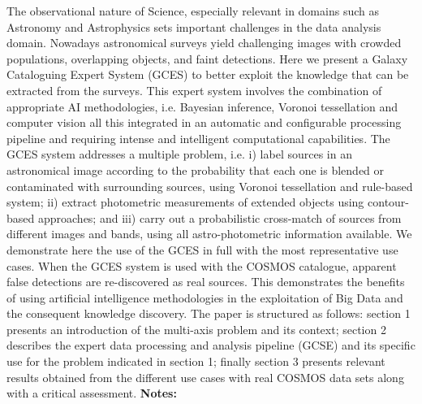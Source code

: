\documentclass{report}
\begin{document}
{{{{{{{{{{{{{{{{{{{{{{{{{{{{{{{{{{{{{{{{{{{{{{{{{{{{{{{{{{{{{{{{{{{{{{{{{{{{{{{{{{{{{{{{{{{{{{{{{{{{{{{{{{{{{{{{{{{{{{{{{The observational nature of Science, especially relevant in domains such as Astronomy and Astrophysics sets important challenges in the data analysis domain. Nowadays astronomical surveys yield challenging images with crowded populations, overlapping objects, and faint detections. Here we present a Galaxy Cataloguing Expert System (GCES) to better exploit the knowledge that can be extracted from the surveys. This expert system involves the combination of appropriate AI methodologies, i.e. Bayesian inference, Voronoi tessellation and computer vision all this integrated in an automatic and configurable processing pipeline and requiring intense and intelligent computational capabilities. The GCES system addresses a multiple problem, i.e. i) label sources in an astronomical image according to the probability that each one is blended or contaminated with surrounding sources, using Voronoi tessellation and rule-based system; ii) extract photometric measurements of extended objects using contour-based approaches; and iii) carry out a probabilistic cross-match of sources from different images and bands, using all astro-photometric information available. We demonstrate here the use of the GCES in full with the most representative use cases. When the GCES system is used with the COSMOS catalogue, apparent false detections are re-discovered as real sources. This demonstrates the benefits of using artificial intelligence methodologies in the exploitation of Big Data and the consequent knowledge discovery. The paper is structured as follows: section 1 presents an introduction of the multi-axis problem and its context; section 2 describes the expert data processing and analysis pipeline (GCSE) and its specific use for the problem indicated in section 1; finally section 3 presents relevant results obtained from the different use cases with real COSMOS data sets along with a critical assessment.\newline
{\bf Notes:}\newline
{\newpage
}}}}}}}}}}}}}}}}}}}}}}}}}}}}}}}}}}}}}}}}}}}}}}}}}}}}}}}}}}}}}}}}}}}}}}}}}}}}}}}}}}}}}}}}}}}}}}}}}}}}}}}}}}}}}}}}}}}}}}}}}}
\end{document}
